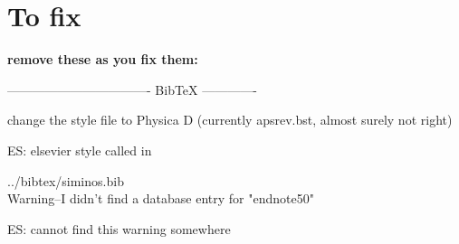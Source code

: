 
\section*{To fix}

{\bf remove these as you fix them:}



---------------------------------- BibTeX -------------


change the style file to Physica D (currently apsrev.bst,
almost surely not right)

ES: elsevier style called in %

../bibtex/siminos.bib
\\
Warning--I didn't find a database entry for "endnote50"

ES: cannot find this warning somewhere

